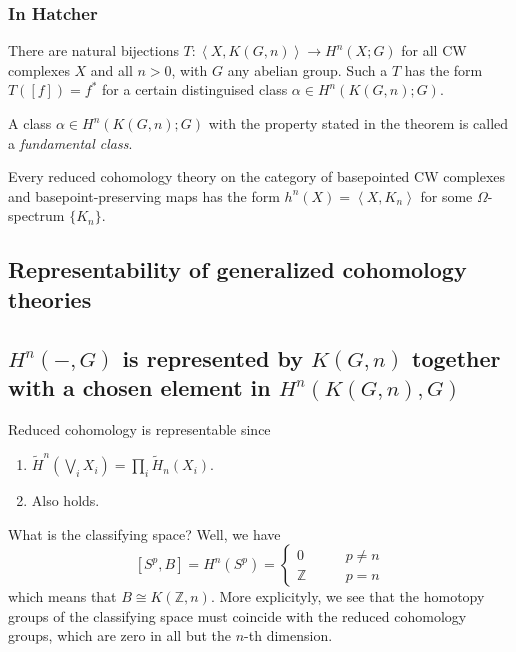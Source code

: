 \begin{definition}
\subsubsection{In Hatcher}

\begin{theorem}[4.57]
	There are natural bijections $T:\left<X,K(G,n) \right> \to H^{n}(X;G)$ for all CW complexes $X$ and all $n>0$, with $G$ any abelian group. Such a $T$ has the form $T([f])=f^{*}$ for a certain distinguised class $\alpha\in H^{n}(K(G,n);G)$.
\end{theorem}

\begin{definition}
	A class $\alpha\in H^{n}(K(G,n);G)$ with the property stated in the theorem is called a {\it fundamental class}.
\end{definition}


\begin{theorem}[4E.1]
	Every reduced cohomology theory on the category of basepointed CW complexes and basepoint-preserving maps has the form $h^{n} (X)=\left<X,K_{n} \right> $ for some $\Omega$-spectrum $\{K_{n}\} $.
\end{theorem}


\subsection{Representability of generalized cohomology theories}

\subsection{$H^{n}(-,G)$ is represented by  $K(G,n)$ together with a chosen element in $H^{n}(K(G,n),G)$}

Reduced cohomology is representable since

\begin{enumerate}[label=(\roman*)]
	\item $\widetilde{H}^{n}(\bigvee_{i}X_{i})=\prod_{i} \widetilde{H}_{n}(X_{i})$.
	\item Also holds. 
\end{enumerate}

What is the classifying space? Well, we have
$$[S^{p},B]=H^{n}(S^{p})=\begin{cases}
	0\qquad &p\neq n\\
	\mathbb{Z}\qquad &p=n
\end{cases}$$
which means that $B\cong K(\mathbb{Z},n)$. More explicityly, we see that the homotopy groups of the classifying space must coincide with the reduced cohomology groups, which are zero in all but the $n$-th dimension.


\end{definition}
